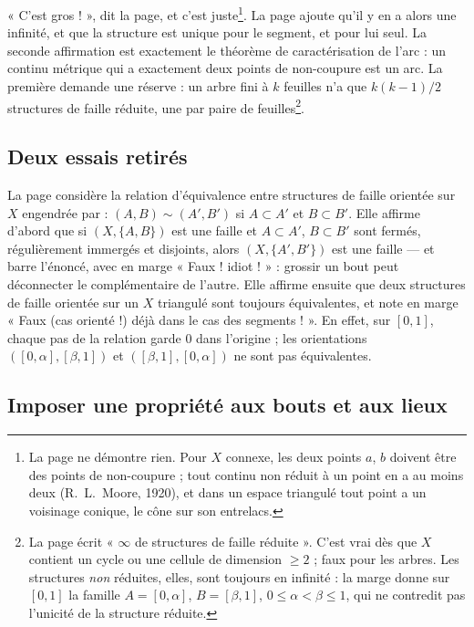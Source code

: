 \documentclass[11pt,a4paper]{article}
\begin{document}
« C'est gros ! », dit la page, et c'est juste\footnote{La page ne démontre rien.
Pour $X$ connexe, les deux points $a$, $b$ doivent être des points de
non-coupure ; tout continu non réduit à un point en a au moins deux (R.~L.~Moore,
1920), et dans un espace triangulé tout point a un voisinage conique, le cône sur
son entrelacs.}. La page ajoute qu'il y en a alors une infinité, et que la
structure est unique pour le segment, et pour lui seul. La seconde affirmation est
exactement le théorème de caractérisation de l'arc : un continu métrique qui a
exactement deux points de non-coupure est un arc. La première demande une
réserve : un arbre fini à $k$ feuilles n'a que $k(k-1)/2$ structures de faille
réduite, une par paire de feuilles\footnote{La page écrit « $\infty$ de
structures de faille réduite ». C'est vrai dès que $X$ contient un cycle ou une
cellule de dimension $\geq 2$ ; faux pour les arbres. Les structures \emph{non}
réduites, elles, sont toujours en infinité : la marge donne sur $[0,1]$ la famille
$A = [0,\alpha]$, $B = [\beta, 1]$, $0 \leq \alpha < \beta \leq 1$, qui ne
contredit pas l'unicité de la structure réduite.}.

\subsection*{Deux essais retirés}

La page considère la relation d'équivalence entre structures de faille orientée
sur $X$ engendrée par : $(A,B) \sim (A',B')$ si $A \subset A'$ et $B \subset B'$.
Elle affirme d'abord que si $(X, \{A,B\})$ est une faille et $A \subset A'$,
$B \subset B'$ sont fermés, régulièrement immergés et disjoints, alors
$(X, \{A',B'\})$ est une faille --- et barre l'énoncé, avec en marge « Faux !
idiot ! » : grossir un bout peut déconnecter le complémentaire de l'autre. Elle
affirme ensuite que deux structures de faille orientée sur un $X$ triangulé sont
toujours équivalentes, et note en marge « Faux (cas orienté !) déjà dans le cas des
segments ! ». En effet, sur $[0,1]$, chaque pas de la relation garde $0$ dans
l'origine ; les orientations $([0,\alpha], [\beta,1])$ et $([\beta,1],
[0,\alpha])$ ne sont pas équivalentes.

\subsection*{Imposer une propriété aux bouts et aux lieux}
\end{document}
